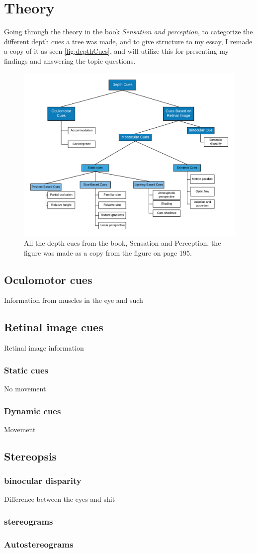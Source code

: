 \chapter{Theory}
	Going through the theory in the book \textit{Sensation and perception}, to categorize the different depth cues a tree was made, and to give structure to my essay, I remade a copy of it as seen \autoref{fig:depthCues}, and will utilize this for presenting my findings and answering the topic questions.
	\begin{figure}[H]
		\centering
		\includegraphics[width=1\linewidth]{figure/depthcues}
		\caption{All the depth cues from the book, Sensation and Perception\citep{sensationPerception}, the figure was made as a copy from the figure on page 195.}
		\label{fig:depthCues}
	\end{figure}
	\section{Oculomotor cues}
		Information from muscles in the eye and such
	\section{Retinal image cues}
		Retinal image information
		\subsection{Static cues}
			No movement
		\subsection{Dynamic cues}
			Movement
	\section{Stereopsis}
		
		\subsection{binocular disparity}
		Difference between the eyes and shit
		
		\subsection*{stereograms}
		
		\subsection*{Autostereograms}